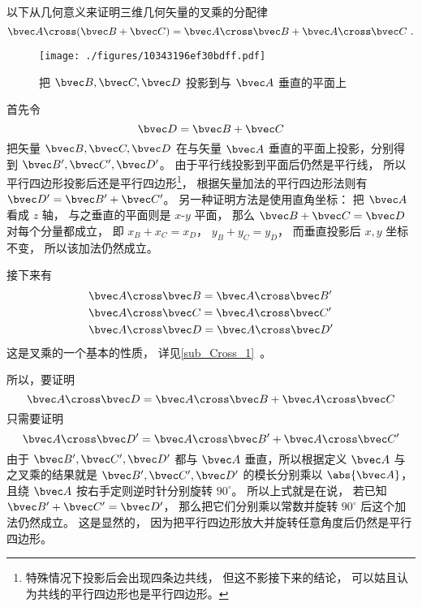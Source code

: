 
以下从几何意义来证明三维几何矢量的叉乘的分配律
\begin{equation}
\bvec A \cross (\bvec B + \bvec C) = \bvec A \cross \bvec B + \bvec A \cross \bvec C~.
\end{equation}

\begin{figure}[ht]
\vskip-10pt
\centering
\texttt{[image: ./figures/10343196ef30bdff.pdf]}
\caption{把 $\bvec B,\bvec C,\bvec D$ 投影到与 $\bvec A$ 垂直的平面上}\label{fig_CrossP_1}
\end{figure}

首先令
\begin{equation}
\bvec D = \bvec B + \bvec C
\end{equation}
把矢量 $\bvec B,\bvec C,\bvec D$ 在与矢量 $\bvec A$ 垂直的平面上投影，分别得到 $\bvec B',\bvec C',\bvec D'$。 由于平行线投影到平面后仍然是平行线， 所以平行四边形投影后还是平行四边形\footnote{特殊情况下投影后会出现四条边共线， 但这不影接下来的结论， 可以姑且认为共线的平行四边形也是平行四边形。}， 根据矢量加法的平行四边形法则有 $\bvec D'=\bvec B'+\bvec C'$。 另一种证明方法是使用直角坐标： 把 $\bvec A$ 看成 $z$ 轴， 与之垂直的平面则是 $x$-$y$ 平面， 那么 $\bvec B + \bvec C = \bvec D$ 对每个分量都成立， 即 $x_B + x_C = x_D$， $y_B + y_C = y_D$， 而垂直投影后 $x,y$ 坐标不变， 所以该加法仍然成立。

接下来有
\begin{equation}\label{eq_CrossP_2}
\begin{aligned}
&\bvec A \cross \bvec B = \bvec A \cross \bvec B'\\
&\bvec A \cross \bvec C = \bvec A \cross \bvec C'\\
&\bvec A \cross \bvec D = \bvec A \cross \bvec D'
\end{aligned}
\end{equation} 
这是叉乘的一个基本的性质， 详见\autoref{sub_Cross_1}~。

所以，要证明
\begin{equation}\label{eq_CrossP_1}
\bvec A \cross \bvec D = \bvec A \cross \bvec B + \bvec A \cross \bvec C
\end{equation}
只需要证明
\begin{equation}
\bvec A \cross \bvec D' = \bvec A \cross \bvec B' + \bvec A \cross \bvec C'
\end{equation}
由于 $\bvec B', \bvec C', \bvec D'$ 都与 $\bvec A$ 垂直，所以根据定义 $\bvec A$ 与之叉乘的结果就是 $\bvec B', \bvec C', \bvec D'$ 的模长分别乘以 $\abs {\bvec A}$， 且绕 $\bvec A$ 按右手定则逆时针分别旋转 $90^\circ$。 所以上式就是在说， 若已知 $\bvec B' + \bvec C' = \bvec D'$， 那么把它们分别乘以常数并旋转 $90^\circ$ 后这个加法仍然成立。 这是显然的， 因为把平行四边形放大并旋转任意角度后仍然是平行四边形。

